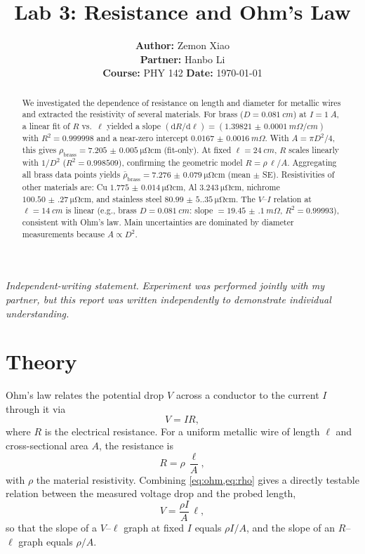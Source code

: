 \documentclass[12pt]{article}
\title{\textbf{Lab 3: Resistance and Ohm's Law}}
\author{
  \textbf{Author:} Zemon Xiao\\
  \textbf{Partner:} Hanbo Li\\[2pt]
  \textbf{Course:} PHY 142 \quad
  \textbf{Date:} \today
}
\date{} %
\numberwithin{equation}{section}
\begin{document}
\maketitle

\noindent\textit{Independent-writing statement.}
\emph{Experiment was performed jointly with my partner, but this report was written independently to demonstrate individual understanding.}

\begin{abstract}
We investigated the dependence of resistance on length and diameter for metallic wires and extracted the resistivity of several materials. For brass ($D=\SI{0.081}{cm}$) at $I=\SI{1}{A}$, a linear fit of $R$ vs.\ $\ell$ yielded a slope $(\mathrm{d}R/\mathrm{d}\ell)=(\SI{1.39821(10)}{m\Omega/cm})$ with $R^2=\num{0.999998}$ and a near-zero intercept $\SI{0.0167(16)}{m\Omega}$. With $A=\pi D^2/4$, this gives $\rho_{\text{brass}}=\SI{7.205(5)}{\micro\ohm\centi\metre}$ (fit-only). At fixed $\ell=\SI{24}{cm}$, $R$ scales linearly with $1/D^2$ ($R^2=\num{0.998509}$), confirming the geometric model $R=\rho\,\ell/A$. Aggregating all brass data points yields $\bar\rho_{\text{brass}}=\SI{7.276(79)}{\micro\ohm\centi\metre}$ (mean $\pm$ SE). Resistivities of other materials are: Cu $\SI{1.775(14)}{\micro\ohm\centi\metre}$, Al $\SI{3.243}{\micro\ohm\centi\metre}$, nichrome $\SI{100.50(27)}{\micro\ohm\centi\metre}$, and stainless steel $\SI{80.99(5.35)}{\micro\ohm\centi\metre}$. The $V$–$I$ relation at $\ell=\SI{14}{cm}$ is linear (e.g., brass $D=\SI{0.081}{cm}$: slope $=\SI{19.45(10)}{m\Omega}$, $R^2=\num{0.99993}$), consistent with Ohm's law. Main uncertainties are dominated by diameter measurements because $A\propto D^2$.
\end{abstract}


\section{Theory}

Ohm's law relates the potential drop $V$ across a conductor to the current $I$ through it via
\begin{equation}
  V = I R,
  \label{eq:ohm}
\end{equation}
where $R$ is the electrical resistance. For a uniform metallic wire of length $\ell$ and cross-sectional area $A$, the resistance is
\begin{equation}
  R = \rho \,\frac{\ell}{A},
  \label{eq:rho}
\end{equation}
with $\rho$ the material resistivity. Combining \cref{eq:ohm,eq:rho} gives a directly testable relation between the measured voltage drop and the probed length,
\begin{equation}
  V = \frac{\rho I}{A}\,\ell,
  \label{eq:Vell}
\end{equation}
so that the slope of a $V$--$\ell$ graph at fixed $I$ equals $\rho I/A$, and the slope of an $R$--$\ell$ graph equals $\rho/A$.
\end{document}
